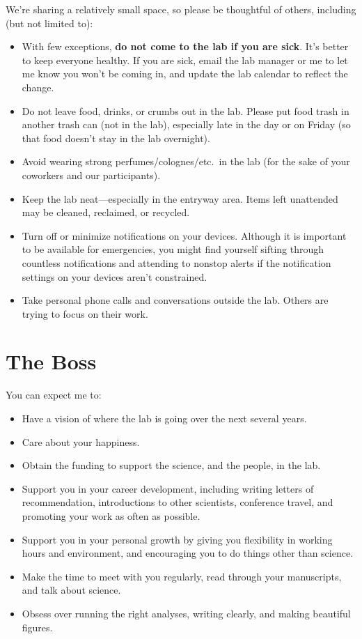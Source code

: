 \documentclass[letterpaper,11pt,oneside]{memoir}
\begin{document}
We're sharing a relatively small space, so please be thoughtful of others, including (but not limited to):

\begin{itemize}
\item With few exceptions, \textbf{do not come to the lab if you are sick}. It's better to keep everyone healthy. If you are sick, email the lab manager or me to let me know you won't be coming in, and update the lab calendar to reflect the change.
\item Do not leave food, drinks, or crumbs out in the lab. Please put food trash in another trash can (not in the lab), especially late in the day or on Friday (so that food doesn't stay in the lab overnight).
\item Avoid wearing strong perfumes/colognes/etc.\ in the lab (for the sake of your coworkers and our participants).
\item Keep the lab neat---especially in the entryway area. Items left unattended may be cleaned, reclaimed, or recycled.
\item Turn off or minimize notifications on your devices. Although it is important to be available for emergencies, you might find yourself sifting through countless notifications and attending to nonstop alerts if the notification settings on your devices aren't constrained.
\item Take personal phone calls and conversations outside the lab. Others are trying to focus on their work.
\end{itemize}


\section{The Boss}

You can expect me to:

\begin{itemize}
\item Have a vision of where the lab is going over the next several years.
\item Care about your happiness.
\item Obtain the funding to support the science, and the people, in the lab.
\item Support you in your career development, including writing letters of recommendation, introductions to other scientists, conference travel, and promoting your work as often as possible.
\item Support you in your personal growth by giving you flexibility in working hours and environment, and encouraging you to do things other than science.
\item Make the time to meet with you regularly, read through your manuscripts, and talk about science.
\item Obsess over running the right analyses, writing clearly, and making beautiful figures.
\end{itemize}
\end{document}
